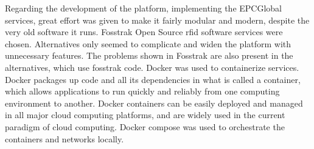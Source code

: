 Regarding the development of the platform, implementing the EPCGlobal services, great effort was given to make it fairly modular and modern, despite the very old software it runs.
Fosstrak Open Source \ac{rfid} software services were chosen. Alternatives only seemed to complicate and widen the platform with unnecessary features. The problems shown in Fosstrak are also present in the alternatives, which use fosstrak code.
Docker was used to containerize services. 
Docker packages up code and all its dependencies in what is called a container, which allows applications to run quickly and reliably from one computing environment to another. Docker containers can be easily deployed and managed in all major cloud computing platforms, and are widely used in the current paradigm of cloud computing.
Docker compose was used to orchestrate the containers and networks locally.
